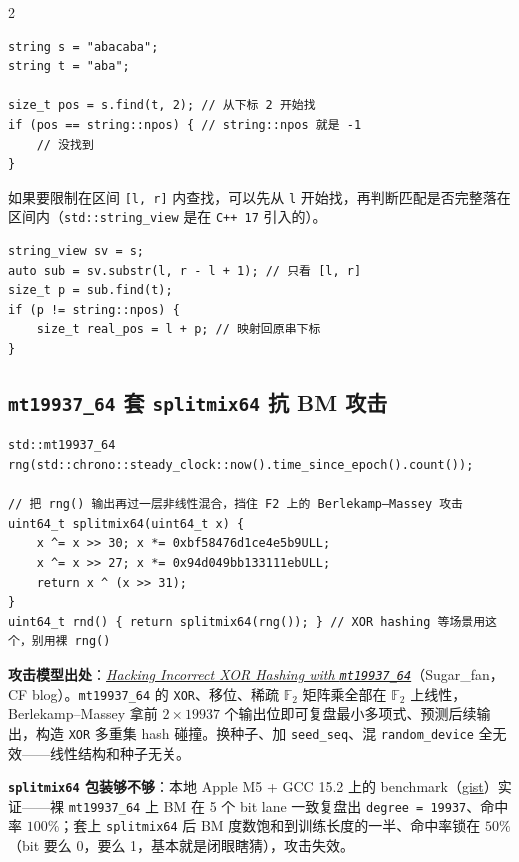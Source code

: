 \begin{multicols*}{2}
		\begin{verbatim}
string s = "abacaba";
string t = "aba";

size_t pos = s.find(t, 2); // 从下标 2 开始找
if (pos == string::npos) { // string::npos 就是 -1
	// 没找到
}
		\end{verbatim}

		如果要限制在区间 \verb|[l, r]| 内查找，可以先从 \verb|l| 开始找，再判断匹配是否完整落在区间内（\verb|std::string_view| 是在 \verb|C++ 17| 引入的）。

		\begin{verbatim}
string_view sv = s;
auto sub = sv.substr(l, r - l + 1); // 只看 [l, r]
size_t p = sub.find(t);
if (p != string::npos) {
	size_t real_pos = l + p; // 映射回原串下标
}
		\end{verbatim}

		\subsection{\texttt{mt19937\_64} 套 \texttt{splitmix64} 抗 BM 攻击}

		\begin{verbatim}
std::mt19937_64 rng(std::chrono::steady_clock::now().time_since_epoch().count());

// 把 rng() 输出再过一层非线性混合，挡住 F2 上的 Berlekamp–Massey 攻击
uint64_t splitmix64(uint64_t x) {
	x ^= x >> 30; x *= 0xbf58476d1ce4e5b9ULL;
	x ^= x >> 27; x *= 0x94d049bb133111ebULL;
	return x ^ (x >> 31);
}
uint64_t rnd() { return splitmix64(rng()); } // XOR hashing 等场景用这个，别用裸 rng()
		\end{verbatim}

		\textbf{攻击模型出处}：\href{https://codeforces.com/blog/entry/153335}{\textit{Hacking Incorrect XOR Hashing with \texttt{mt19937\_64}}}（Sugar\_fan，CF blog）。\texttt{mt19937\_64} 的 \texttt{XOR}、移位、稀疏 $\mathbb{F}_2$ 矩阵乘全部在 $\mathbb{F}_2$ 上线性，Berlekamp–Massey 拿前 $2 \times 19937$ 个输出位即可复盘最小多项式、预测后续输出，构造 \texttt{XOR} 多重集 hash 碰撞。换种子、加 \texttt{seed\_seq}、混 \texttt{random\_device} 全无效——线性结构和种子无关。

		\textbf{\texttt{splitmix64} 包装够不够}：本地 Apple M5 + GCC 15.2 上的 benchmark（\href{https://gist.github.com/znzryb/a867eefeb8575e1c5f599a5044273614}{gist}）实证——裸 \texttt{mt19937\_64} 上 BM 在 5 个 bit lane 一致复盘出 \texttt{degree = 19937}、命中率 $100\%$；套上 \texttt{splitmix64} 后 BM 度数饱和到训练长度的一半、命中率锁在 $50\%$（bit 要么 0，要么 1，基本就是闭眼瞎猜），攻击失效。


\end{multicols*}
